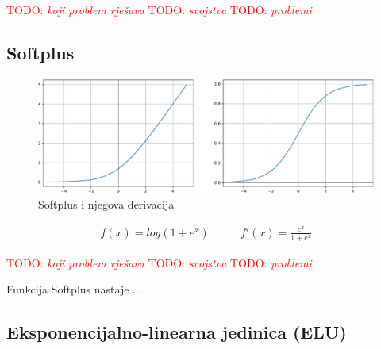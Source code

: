 \documentclass[times, utf8, numeric, diplomski]{fer}
\def\TODO#1{\noindent\textcolor{red}{TODO: \textit{#1}}\newline}
\def\todo#1{\TODO{#1}}
\def\todoimg#1{\begin{center} \textcolor{red}{\big[ IMAGE: \textit{#1} \big]} \end{center}}
\begin{document}
\todo{koji problem rješava}
\todo{svojstva}
\todo{problemi}
\fi %

\subsection{Softplus}

\begin{figure}[H]
\includegraphics[width=\textwidth]{Softplus.pdf}
\centering
\caption{Softplus i njegova derivacija}
\label{fig:softplus}
\end{figure}

\begin{equation}
\label{eq:softplus}
\begin{split}
f(x) = log(1+e^x)
\end{split}
\qquad
\begin{split}
f'(x) = \frac{e^x}{1+e^x}
\end{split}
\end{equation}

\todo{koji problem rješava}
\todo{svojstva}
\todo{problemi}

Funkcija Softplus nastaje ...

%

\subsection{Eksponencijalno-linearna jedinica (ELU)}
\end{document}
